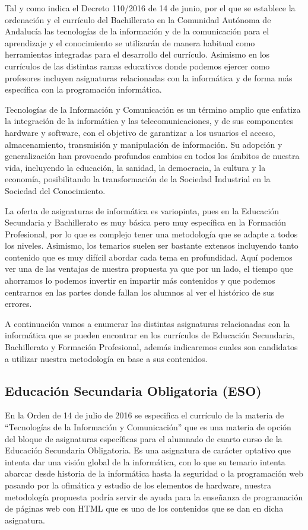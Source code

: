 Tal y como indica el Decreto 110/2016  de 14 de junio, por el que se establece la ordenación y el currículo del Bachillerato en la Comunidad Autónoma de Andalucía las tecnologías de la información y de la comunicación para el aprendizaje y el conocimiento se utilizarán de manera habitual como herramientas integradas para el desarrollo del currículo. Asimismo en los currículos de las distintas ramas educativos donde podemos ejercer como profesores incluyen asignaturas relacionadas con la informática y de forma más específica con la programación informática.


\bigskip
Tecnologías de la Información y Comunicación es un término amplio que enfatiza la integración de la informática y las telecomunicaciones, y de sus componentes hardware y software, con el objetivo de garantizar a los usuarios el acceso, almacenamiento, transmisión y manipulación de información. Su adopción y generalización han provocado profundos cambios en todos los ámbitos de nuestra vida, incluyendo la educación, la sanidad, la democracia, la cultura y la economía, posibilitando la transformación de la Sociedad Industrial en la Sociedad del Conocimiento.

\bigskip
La oferta de asignaturas de informática es variopinta, pues en la Educación Secundaria y Bachillerato es muy básica pero muy específica en la Formación Profesional, por lo que es complejo tener una metodología que se adapte a todos los niveles. Asimismo, los temarios suelen ser bastante extensos incluyendo tanto contenido que es muy difícil abordar cada tema en profundidad. Aquí podemos ver una de las ventajas de nuestra propuesta ya que por un lado, el tiempo que ahorramos lo podemos invertir en impartir más contenidos y que podemos centrarnos en las partes donde fallan los alumnos al ver el histórico de sus errores.

\bigskip
A continuación vamos a enumerar las distintas asignaturas relacionadas con la informática que se pueden encontrar en los currículos de Educación Secundaria, Bachillerato y Formación Profesional, además indicaremos cuales son candidatos a utilizar nuestra metodología en base a sus contenidos.

\subsection {Educación Secundaria Obligatoria (ESO)}

En la Orden de 14 de julio de 2016 se especifica el currículo de la materia de ``Tecnologías de la Información y Comunicación'' que es una materia de opción del bloque de asignaturas específicas para el alumnado de cuarto curso de la Educación Secundaria Obligatoria. Es una asignatura de carácter optativo que intenta dar una visión global de la informática, con lo que su temario intenta abarcar desde historia de la informática hasta la seguridad o la programación web pasando por la ofimática y estudio de los elementos de hardware, nuestra metodología propuesta podría servir de ayuda para la enseñanza de programación de páginas web con HTML que es uno de los contenidos que se dan en dicha asignatura.

